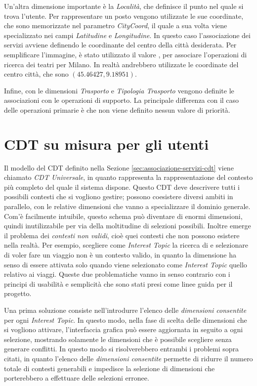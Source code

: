 Un'altra dimensione importante è la \emph{Località}, che definisce il punto nel quale si trova l'utente. Per rappresentare un posto vengono utilizzate le sue coordinate, che sono memorizzate nel parametro \emph{CityCoord}, il quale a sua volta viene specializzato nei campi \emph{Latitudine} e \emph{Longitudine}. In questo caso l'associazione dei servizi avviene definendo le coordinante del centro della città desiderata. Per semplificare l'immagine, è stato utilizzato il valore , per associare l'operazioni di ricerca dei teatri per Milano. In realtà andrebbero utilizzate le coordinate del centro città, che sono $ (45.46427, 9.18951) $.

Infine, con le dimensioni \emph{Trasporto} e \emph{Tipologia Trasporto} vengono definite le associazioni con le operazioni di supporto. La principale differenza con il caso delle operazioni primarie è che non viene definito nessun valore di priorità.

\section{CDT su misura per gli utenti\label{sec:cdt-su-misura}}

Il modello del CDT definito nella Sezione \ref{sec:associazione-servizi-cdt} viene chiamato \emph{CDT Universale}, in quanto rappresenta la rappresentazione del contesto più completo del quale il sistema dispone. Questo CDT deve descrivere tutti i possibili contesti che si vogliono gestire; possono coesistere diversi ambiti in parallelo, con le relative dimensioni che vanno a specializzare il dominio generale. Com'è facilmente intuibile, questo schema può diventare di enormi dimensioni, quindi inutilizzabile per via della moltitudine di selezioni possibili. Inoltre emerge il problema dei \emph{contesti non validi}, cioè quei contesti che non possono esistere nella realtà. Per esempio, scegliere come \emph{Interest Topic} la ricerca di  e selezionare di voler fare un viaggio  non è un contesto valido, in quanto la dimensione  ha senso di essere attivata solo quando viene selezionato come \emph{Interest Topic} quello relativo ai viaggi. Queste due problematiche vanno in senso contrario con i principi di usabilità e semplicità che sono stati presi come linee guida per il progetto.

Una prima soluzione consiste nell'introdurre l'elenco delle \emph{dimensioni consentite} per ogni \emph{Interest Topic}. In questo modo, nella fase di scelta delle dimensioni che si vogliono attivare, l'interfaccia grafica può essere aggiornata in seguito a ogni selezione, mostrando solamente le dimensioni che è possibile scegliere senza generare conflitti. In questo modo si risolverebbero entrambi i problemi sopra citati, in quanto l'elenco delle \emph{dimensioni consentite} permette di ridurre il numero totale di contesti generabili e impedisce la selezione di dimensioni che porterebbero a effettuare delle selezioni erronee.

